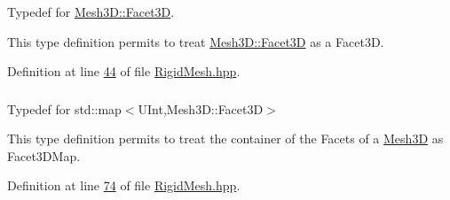 \subsubsection[{\texorpdfstring{Facet3D}{Facet3D}}]{}\hypertarget{classFVCode3D_1_1Rigid__Mesh_aafcadb25b9a244bc7beff08659a0e3cb}{}\label{classFVCode3D_1_1Rigid__Mesh_aafcadb25b9a244bc7beff08659a0e3cb}


Typedef for \hyperlink{classFVCode3D_1_1Mesh3D_1_1Facet3D}{Mesh3\+D\+::\+Facet3D}. 

This type definition permits to treat \hyperlink{classFVCode3D_1_1Mesh3D_1_1Facet3D}{Mesh3\+D\+::\+Facet3D} as a Facet3D. 

Definition at line \hyperlink{RigidMesh_8hpp_source_l00044}{44} of file \hyperlink{RigidMesh_8hpp_source}{Rigid\+Mesh.\+hpp}.

\subsubsection[{\texorpdfstring{Facet3\+D\+Map}{Facet3DMap}}]{}\hypertarget{classFVCode3D_1_1Rigid__Mesh_ae579d78d6aa68fb20068061a01c71225}{}\label{classFVCode3D_1_1Rigid__Mesh_ae579d78d6aa68fb20068061a01c71225}


Typedef for std\+::map$<$\+U\+Int,\+Mesh3\+D\+::\+Facet3\+D$>$ 

This type definition permits to treat the container of the Facets of a \hyperlink{classFVCode3D_1_1Mesh3D}{Mesh3D} as Facet3\+D\+Map. 

Definition at line \hyperlink{RigidMesh_8hpp_source_l00074}{74} of file \hyperlink{RigidMesh_8hpp_source}{Rigid\+Mesh.\+hpp}.

